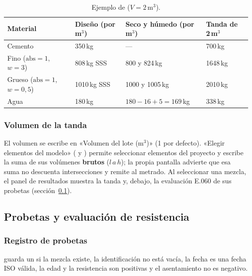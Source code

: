 \begin{table}[H]
	\centering
	\caption{Ejemplo de  ($V = 2$\,m$^3$).}
	\label{tab:con-ejemplo-humedad}
	\begin{tabular}{L{3cm}L{3.4cm}L{3.8cm}L{3cm}}
		\hline
		\textbf{Material} & \textbf{Diseño (por m$^3$)} & \textbf{Seco y húmedo (por m$^3$)} & \textbf{Tanda de 2\,m$^3$} \\ \hline
		Cemento & 350\,kg & --- & 700\,kg \\
		Fino ($\text{abs}=1$, $w=3$) & 808\,kg SSS & 800 y 824\,kg & 1648\,kg \\
		Grueso ($\text{abs}=1$, $w=0{,}5$) & 1010\,kg SSS & 1000 y 1005\,kg & 2010\,kg \\
		Agua & 180\,kg & $180 - 16 + 5 = 169$\,kg & 338\,kg \\
		\hline
	\end{tabular}
\end{table}

\subsubsection{Volumen de la tanda}

El volumen se escribe en «Volumen del lote (m$^3$)» (1 por defecto). «Elegir elementos del modelo»
( y ) permite seleccionar elementos del proyecto y escribe la suma de sus
volúmenes \textbf{brutos} ($l\,a\,h$); la propia pantalla advierte que esa suma no descuenta intersecciones y remite al
metrado. Al seleccionar una mezcla, el panel de resultados muestra la tanda y, debajo, la evaluación E.060 de sus
probetas (sección~\ref{sec:con-ensayos}).

\subsection{Probetas y evaluación de resistencia}
\label{sec:con-ensayos}

\subsubsection{Registro de probetas}

 guarda un  si la mezcla existe, la identificación no está
vacía, la fecha es una fecha ISO válida, la edad y la resistencia son positivas y el asentamiento no es negativo.

